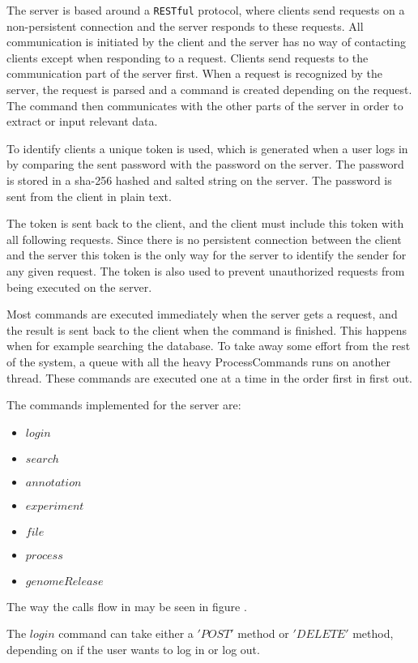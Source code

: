
\label{chap:com_systemdesign}
The server is based around a \texttt{RESTful} protocol, where clients send requests on a non-persistent connection and the server responds to these requests. All communication is initiated by the client and the server has no way of contacting clients except when responding to a request. Clients send requests to the communication part of the server first. When a request is recognized by the server, the request is parsed and a command is created depending on the request. The command then communicates with the other parts of the server in order to extract or input relevant data.

To identify clients a unique token is used, which is generated when a user logs in by comparing the sent password with the password on the server. The password is stored in a sha-256 hashed and salted string on the server. The password is sent from the client in plain text.

The token is sent back to the client, and the client must include this token with all following requests. Since there is no persistent connection between the client and the server this token is the only way for the server to identify the sender for any given request. The token is also used to prevent unauthorized requests from being executed on the server.

Most commands are executed immediately when the server gets a request, and the result is sent back to the client when the command is finished. This happens when for example searching the database. To take away some effort from the rest of the system, a queue with all the heavy ProcessCommands runs on another thread. These commands are executed one at a time in the order first in first out.

The commands implemented for the server are:

\begin{itemize}
	\item $login$
	\item $search$
	\item $annotation$
	\item $experiment$
	\item $file$
	\item $process$
	\item $genomeRelease$
\end{itemize}

The way the calls flow in may be seen in figure .

The $login$ command can take either a $'POST'$ method or $'DELETE'$ method, depending on if the user wants to log in or log out.

